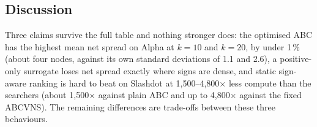 \documentclass[journal,letterpaper,10pt]{IEEEtran}
\begin{document}
\begin{table}[!t]
\centering
\caption{Wall-clock seconds per restart on the common GPU basis, mean $\pm$ standard deviation over restarts. Baselines are deterministic and have no spread.}
\label{tab:time}
\scriptsize
\setlength{\tabcolsep}{2pt}
\end{table}

\subsection{Discussion}

Three claims survive the full table and nothing stronger does: the optimised ABC has the highest mean net spread on Alpha at $k=10$ and $k=20$, by under 1\,\% (about four nodes, against its own standard deviations of 1.1 and 2.6), a positive-only surrogate loses net spread exactly where signs are dense, and static sign-aware ranking is hard to beat on Slashdot at 1{,}500--4{,}800$\times$ less compute than the searchers (about 1{,}500$\times$ against plain ABC and up to 4{,}800$\times$ against the fixed ABCVNS). The remaining differences are trade-offs between these three behaviours.
\end{document}
